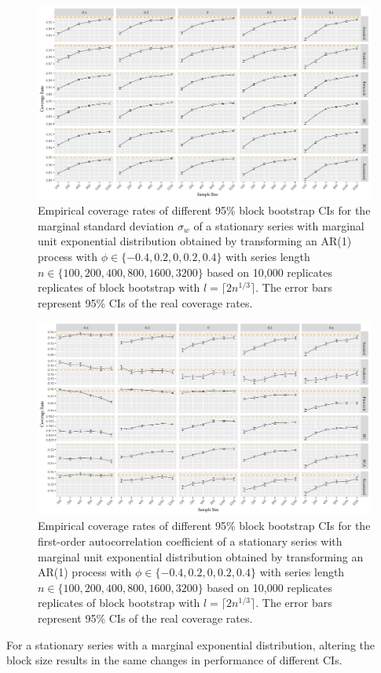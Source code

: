 \documentclass[10pt]{article}
\newcommand{\eds}[1]{\textcolor{red}{EDS: (#1)}}
\newcommand{\mc}[1]{\textcolor{orange}{MC: (#1)}}
\begin{document}
\begin{figure}[tbp]
  \centering
  \includegraphics[width=\textwidth]{figures/plot_exp_sigma_2}
  \caption{Empirical coverage rates of different 95\% block bootstrap CIs for
    the marginal standard deviation $\sigma_w$ %
    of a stationary series with 
    marginal unit exponential distribution obtained by transforming an AR(1) process
    with $\phi \in \{-0.4, 0.2, 0, 0.2, 0.4\}$ with series length 
    $n \in \{100, 200, 400, 800, 1600, 3200\}$ based on 10,000 replicates 
    replicates of
    block bootstrap with $l = \lceil 2n^{1/3} \rceil$. 
    The error bars represent 95\% CIs of the real coverage rates.}
  \label{fig:exp_sigma2}
\end{figure}


\begin{figure}[tbp]
  \centering
  \includegraphics[width=\textwidth]{figures/plot_exp_phi_2}
  \caption{Empirical coverage rates of different 95\% block bootstrap CIs for 
    the first-order autocorrelation coefficient of a stationary series
    with marginal unit exponential distribution obtained by transforming an AR(1) 
    process with 
    $\phi \in \{-0.4, 0.2, 0, 0.2, 0.4\}$ with series length
    $n \in \{100, 200, 400, 800, 1600, 3200\}$ based on 10,000 replicates 
    replicates of
    block bootstrap with $l = \lceil 2n^{1/3} \rceil$. 
    The error bars represent 95\% CIs of the real coverage rates.}
  \label{fig:exp_phi2}
\end{figure}

For a stationary series with a marginal exponential distribution, altering the 
block size results in the same 
changes in performance of different CIs.
 


\end{document}

